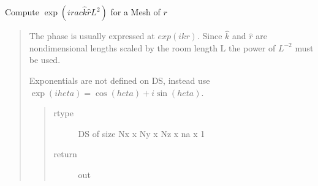 \documentclass[letterpaper,10pt,english]{sphinxmanual}
\begin{document}
\begin{fulllineitems}
\label{\detokenize{index:DictionarySparseMatrix.phase_calc}}
Compute \(\exp(i
rac{\hat{k}\hat{r}}{L^2})\)   for a Mesh of \(r\)
\begin{quote}

The phase is usually expressed at \(exp(ikr)\).
Since \(\hat{k}\) and \(\hat{r}\) are nondimensional lengths   scaled by the room length L the power of \(L^{-2}\) must be used.

Exponentials are not defined on DS, instead use   \(\exp(i       heta)=\cos(     heta)+i\sin(    heta)\).

\begin{sphinxVerbatim}[commandchars=\\\{\}]
\end{sphinxVerbatim}
\begin{quote}\begin{description}
\item[{rtype}] \leavevmode
DS of size Nx x Ny x Nz x na x 1

\item[{return}] \leavevmode
out

\end{description}\end{quote}
\end{quote}

\end{fulllineitems}

\end{document}
